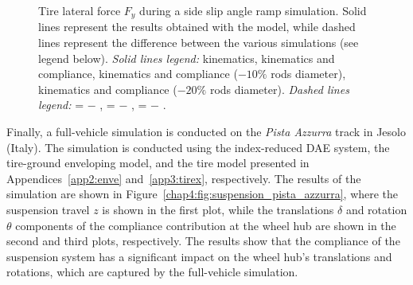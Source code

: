 \begin{figure}[!htp]
  \centering
  \small{}
  \caption{Tire lateral force $F_y$ during a side slip angle ramp simulation. Solid lines represent the results obtained with the \Simulink{} model, while dashed lines represent the difference between the various simulations (see legend below). \emph{Solid lines legend:}
  {\color{mycolor1}\raisebox{-.15pt}{$\blacksquare$}} kinematics, {\color{mycolor2}\raisebox{-.15pt}{$\blacksquare$}} kinematics and compliance, {\color{mycolor3}\raisebox{-.15pt}{$\blacksquare$}} kinematics and compliance ($-10\%$ rods diameter), {\color{mycolor5}\raisebox{-.15pt}{$\blacksquare$}} kinematics and compliance ($-20\%$ rods diameter).   \emph{Dashed lines legend:} {\color{mycolor1}\raisebox{-.15pt}{\scalebox{0.5}[1.0]{$\blacksquare$}}}{\color{mycolor2}\raisebox{-.15pt}{\scalebox{0.5}[1.0]{$\blacksquare$}}} = {\color{mycolor1}\raisebox{-.15pt}{$\blacksquare$}} $-$ {\color{mycolor2}\raisebox{-.15pt}{$\blacksquare$}}, {\color{mycolor1}\raisebox{-.15pt}{\scalebox{0.5}[1.0]{$\blacksquare$}}}{\color{mycolor3}\raisebox{-.15pt}{\scalebox{0.5}[1.0]{$\blacksquare$}}} = {\color{mycolor1}\raisebox{-.15pt}{$\blacksquare$}} $-$ {\color{mycolor3}\raisebox{-.15pt}{$\blacksquare$}},  {\color{mycolor1}\raisebox{-.15pt}{\scalebox{0.5}[1.0]{$\blacksquare$}}}{\color{mycolor5}\raisebox{-.15pt}{\scalebox{0.5}[1.0]{$\blacksquare$}}} = {\color{mycolor1}\raisebox{-.15pt}{$\blacksquare$}} $-$ {\color{mycolor5}\raisebox{-.15pt}{$\blacksquare$}}.
  }
  \label{chap4:fig:test_bench}
\end{figure}

Finally, a full-vehicle simulation is conducted on the \textit{Pista Azzurra} track in Jesolo (Italy). The simulation is conducted using the index-reduced \ac{DAE} system, the tire-ground enveloping model, and the tire model presented in Appendices~\ref{app2:enve} and~\ref{app3:tirex}, respectively. The results of the simulation are shown in Figure~\ref{chap4:fig:suspension_pista_azzurra}, where the suspension travel $z$ is shown in the first plot, while the translations $\delta$ and rotation $\theta$ components of the compliance contribution at the wheel hub are shown in the second and third plots, respectively. The results show that the compliance of the suspension system has a significant impact on the wheel hub's translations and rotations, which are captured by the full-vehicle simulation.

